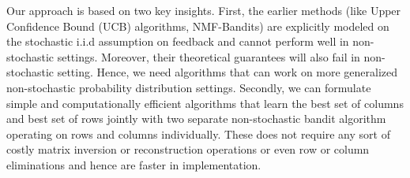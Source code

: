 Our approach is based on two key insights. First, the earlier methods (like Upper Confidence Bound (UCB) algorithms, NMF-Bandits) are explicitly modeled on the stochastic i.i.d assumption on feedback and cannot perform well in non-stochastic settings. Moreover, their theoretical guarantees will also fail in non-stochastic setting. Hence, we need algorithms that can work on more generalized non-stochastic probability distribution settings. Secondly, we can formulate simple and computationally efficient algorithms that learn the best set of columns and best set of rows jointly with two separate non-stochastic bandit algorithm operating on rows and columns individually. These does not require any sort of costly matrix inversion or reconstruction operations or even row or column eliminations and hence are faster in implementation. 




